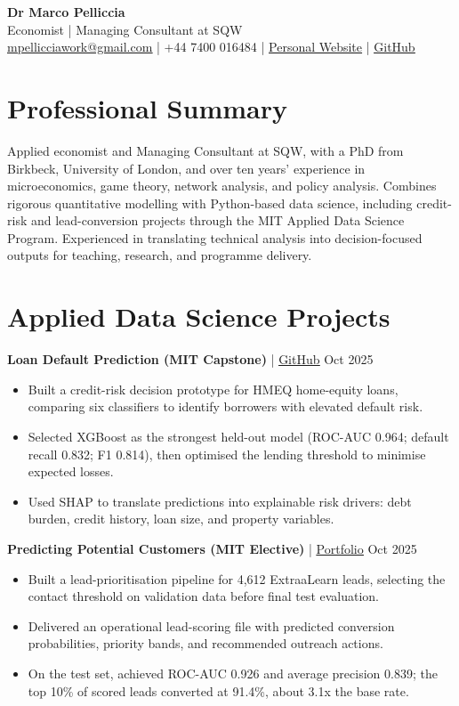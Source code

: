 \documentclass[11pt,a4paper]{article}
\newcommand{\cvlink}[2]{\href{#1}{\textcolor{linkblue}{\underline{#2}}}}
\begin{document}
\noindent
{\Huge \textbf{Dr Marco Pelliccia}} \\ [4pt]
{\large Economist | Managing Consultant at SQW} \\ [8pt]
\noindent \cvlink{mailto:mpellicciawork@gmail.com}{mpellicciawork@gmail.com} | +44 7400 016484 | \cvlink{https://www.marcopelliccia.com}{Personal Website} | \cvlink{https://github.com/ddmarco84/project}{GitHub}

\section{Professional Summary}
Applied economist and Managing Consultant at SQW, with a PhD from Birkbeck, University of London, and over ten years' experience in microeconomics, game theory, network analysis, and policy analysis. Combines rigorous quantitative modelling with Python-based data science, including credit-risk and lead-conversion projects through the MIT Applied Data Science Program. Experienced in translating technical analysis into decision-focused outputs for teaching, research, and programme delivery.

\section{Applied Data Science Projects}
\textbf{Loan Default Prediction (MIT Capstone)} | \cvlink{https://github.com/ddmarco84/project}{GitHub} \hfill Oct 2025
\begin{itemize}[noitemsep, topsep=2pt]
    \item Built a credit-risk decision prototype for HMEQ home-equity loans, comparing six classifiers to identify borrowers with elevated default risk.
    \item Selected XGBoost as the strongest held-out model (ROC-AUC 0.964; default recall 0.832; F1 0.814), then optimised the lending threshold to minimise expected losses.
    \item Used SHAP to translate predictions into explainable risk drivers: debt burden, credit history, loan size, and property variables.
\end{itemize}

\noindent\textbf{Predicting Potential Customers (MIT Elective)} | \cvlink{https://www.mygreatlearning.com/eportfolio/marco-pelliccia}{Portfolio} \hfill Oct 2025
\begin{itemize}[noitemsep, topsep=2pt]
    \item Built a lead-prioritisation pipeline for 4,612 ExtraaLearn leads, selecting the contact threshold on validation data before final test evaluation.
    \item Delivered an operational lead-scoring file with predicted conversion probabilities, priority bands, and recommended outreach actions.
    \item On the test set, achieved ROC-AUC 0.926 and average precision 0.839; the top 10\% of scored leads converted at 91.4\%, about 3.1x the base rate.
\end{itemize}
\end{document}
